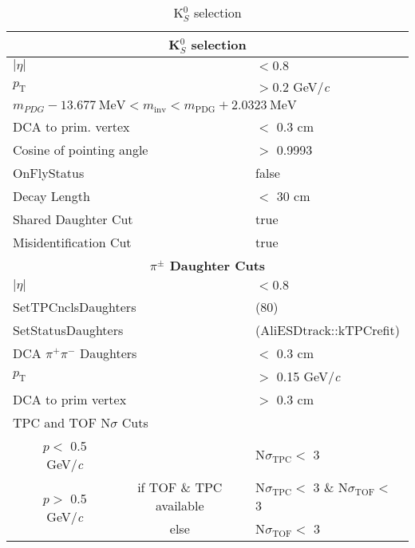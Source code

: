 \documentclass[ALICE,manyauthors]{cernphprep}
\begin{document}
\begin{table}[htbp]
 \centering
  \begin{tabular}{lc|c|l}
   \hline  
   \multicolumn{4}{c}{\textbf{K$^{0}_{S}$ selection}} \\
   \hline
   \multicolumn{3}{l|}{$|\eta|$} & $< 0.8$ \\
   \hline
   \multicolumn{3}{l|}{$p_{\mathrm{T}}$} & $> 0.2$ GeV/\textit{c} \\
   \hline
   \multicolumn{4}{l|}{$m_{PDG}-13.677 \ \mathrm{MeV} < m_{\mathrm{inv}} < m_{\mathrm{PDG}} + 2.0323 \ \mathrm{MeV}$} \\ 
   \hline
   \multicolumn{3}{l|}{DCA to prim. vertex} & $<$ 0.3 cm \\
   \hline
   \multicolumn{3}{l|}{Cosine of pointing angle} & $>$ 0.9993 \\
   \hline
   \multicolumn{3}{l|}{OnFlyStatus} & false \\
   \hline
   \multicolumn{3}{l|}{Decay Length} & $<$ 30 cm \\
   \hline
   \multicolumn{3}{l|}{Shared Daughter Cut} & true \\
   \hline
   \multicolumn{3}{l|}{Misidentification Cut} & true \\
   \hline   
      
   
   \multicolumn{4}{c}{\textbf{$\pi^{\pm}$ Daughter Cuts}} \\
   \hline
   \multicolumn{3}{l|}{$|\eta|$} &  $< 0.8$ \\
   \hline
   \multicolumn{3}{l|}{SetTPCnclsDaughters} & (80) \\
   \hline
   \multicolumn{3}{l|}{SetStatusDaughters} & (AliESDtrack::kTPCrefit) \\
   \hline
   \multicolumn{3}{l|}{DCA $\pi^{+}\pi^{-}$ Daughters} & $<$ 0.3 cm \\
   \hline
   \multicolumn{3}{l|}{$p_{\mathrm{T}}$} & $>$ 0.15 GeV/\textit{c} \\
   \hline
   \multicolumn{3}{l|}{DCA to prim vertex} & $>$ 0.3 cm \\
   \hline
   \multicolumn{4}{l}{TPC and TOF N$\sigma$ Cuts} \\
   \hline
    & \multicolumn{1}{c}{$p <$ 0.5 GeV/\textit{c}} &  & N$\sigma_{\mathrm{TPC}} <$ 3 \\
   \hline
    & \multirow{2}{*}{$p >$ 0.5 GeV/\textit{c}} &  if TOF \& TPC available & N$\sigma_{\mathrm{TPC}} <$ 3 \& N$\sigma_{\mathrm{TOF}} <$ 3 \\
   \cline{3-4}
    & & else & N$\sigma_{\mathrm{TOF}} <$ 3 \\
   \hline   
  \end{tabular}
 \caption{K$^{0}_{S}$ selection}
 \label{tab:K0sCuts} 
\end{table}
\end{document}
